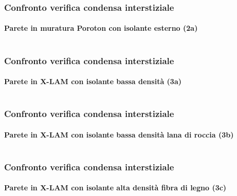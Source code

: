 \documentclass[aspectratio=141,10pt]{beamer}
\begin{document}
\begin{frame}
    \frametitle{Confronto verifica condensa interstiziale}
    \framesubtitle{Parete in muratura Poroton con isolante esterno (2a)}
    \begin{columns}
        \begin{column}{0.45\textwidth}
            \resizebox{\textwidth}{!}{%
            
            }
        \end{column}
        \begin{column}{0.55\textwidth}
            \scriptsize
            
        \end{column}
    \end{columns}
\end{frame}
\begin{frame}
    \frametitle{Confronto verifica condensa interstiziale}
    \framesubtitle{Parete in X-LAM con isolante bassa densità (3a)}
    \begin{columns}
        \begin{column}{0.45\textwidth}
            \resizebox{\textwidth}{!}{%
            
            }
        \end{column}
        \begin{column}{0.55\textwidth}
            \scriptsize
            
        \end{column}
    \end{columns}
\end{frame}
\begin{frame}
    \frametitle{Confronto verifica condensa interstiziale}
    \framesubtitle{Parete in X-LAM con isolante bassa densità lana di roccia (3b)}
    \begin{columns}
        \begin{column}{0.45\textwidth}
            \resizebox{\textwidth}{!}{%
            
            }
        \end{column}
        \begin{column}{0.55\textwidth}
            \scriptsize
            
        \end{column}
    \end{columns}
\end{frame}
\begin{frame}
    \frametitle{Confronto verifica condensa interstiziale}
    \framesubtitle{Parete in X-LAM con isolante alta densità fibra di legno (3c)}
    \begin{columns}
        \begin{column}{0.45\textwidth}
            \resizebox{\textwidth}{!}{%
            
            }
        \end{column}
        \begin{column}{0.55\textwidth}
            \scriptsize
            
        \end{column}
    \end{columns}
\end{frame}
\end{document}
